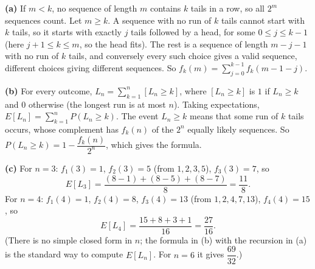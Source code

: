 \textbf{(a)} If $m<k$, no sequence of length $m$ contains $k$ tails in a row, so all $2^m$ sequences count. Let $m\ge k$. A sequence with no run of $k$ tails cannot start with $k$ tails, so it starts with exactly $j$ tails followed by a head, for some $0\le j\le k-1$ (here $j+1\le k\le m$, so the head fits). The rest is a sequence of length $m-j-1$ with no run of $k$ tails, and conversely every such choice gives a valid sequence, different choices giving different sequences. So $f_k(m)=\sum_{j=0}^{k-1}f_k(m-1-j)$.

\textbf{(b)} For every outcome, $L_n=\sum_{k=1}^{n}[L_n\ge k]$, where $[L_n\ge k]$ is $1$ if $L_n\ge k$ and $0$ otherwise (the longest run is at most $n$). Taking expectations, $E[L_n]=\sum_{k=1}^nP(L_n\ge k)$. The event $L_n\ge k$ means that some run of $k$ tails occurs, whose complement has $f_k(n)$ of the $2^n$ equally likely sequences. So $P(L_n\ge k)=1-\dfrac{f_k(n)}{2^n}$, which gives the formula.

\textbf{(c)} For $n=3$: $f_1(3)=1$, $f_2(3)=5$ (from $1,2,3,5$), $f_3(3)=7$, so
\[E[L_3]=\dfrac{(8-1)+(8-5)+(8-7)}{8}=\boxed{\dfrac{11}{8}}.\]
For $n=4$: $f_1(4)=1$, $f_2(4)=8$, $f_3(4)=13$ (from $1,2,4,7,13$), $f_4(4)=15$, so
\[E[L_4]=\dfrac{15+8+3+1}{16}=\boxed{\dfrac{27}{16}}.\]
(There is no simple closed form in $n$; the formula in (b) with the recursion in (a) is the standard way to compute $E[L_n]$. For $n=6$ it gives $\dfrac{69}{32}$.)
